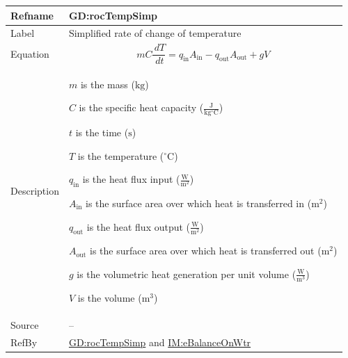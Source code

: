 \documentclass[12pt]{article}
\begin{document}
\vspace{\baselineskip}
\noindent
\begin{minipage}{\textwidth}
\begin{tabular}{>{\raggedright}p{}>{\raggedright\arraybackslash}p{}}
\toprule \textbf{Refname} & \textbf{GD:rocTempSimp}
\label{GD:rocTempSimp}
\\ \midrule
Label & Simplified rate of change of temperature
        
\\ \midrule
Equation & \begin{displaymath}
           m C \frac{\,dT}{\,dt}={q_{\text{in}}} {A_{\text{in}}}-{q_{\text{out}}} {A_{\text{out}}}+g V
           \end{displaymath}
\\ \midrule
Description & \begin{symbDescription}
              \item{$m$ is the mass (${\text{kg}}$)}
              \item{$C$ is the specific heat capacity ($\frac{\text{J}}{\text{kg}{}^{\circ}\text{C}}$)}
              \item{$t$ is the time (${\text{s}}$)}
              \item{$T$ is the temperature (${{}^{\circ}\text{C}}$)}
              \item{${q_{\text{in}}}$ is the heat flux input ($\frac{\text{W}}{\text{m}^{2}}$)}
              \item{${A_{\text{in}}}$ is the surface area over which heat is transferred in (${\text{m}^{2}}$)}
              \item{${q_{\text{out}}}$ is the heat flux output ($\frac{\text{W}}{\text{m}^{2}}$)}
              \item{${A_{\text{out}}}$ is the surface area over which heat is transferred out (${\text{m}^{2}}$)}
              \item{$g$ is the volumetric heat generation per unit volume ($\frac{\text{W}}{\text{m}^{3}}$)}
              \item{$V$ is the volume (${\text{m}^{3}}$)}
              \end{symbDescription}
\\ \midrule
Source & --
         
\\ \midrule
RefBy & \hyperref[GD:rocTempSimp]{GD:rocTempSimp} and \hyperref[IM:eBalanceOnWtr]{IM:eBalanceOnWtr}
        
\\ \bottomrule
\end{tabular}
\end{minipage}
\end{document}
